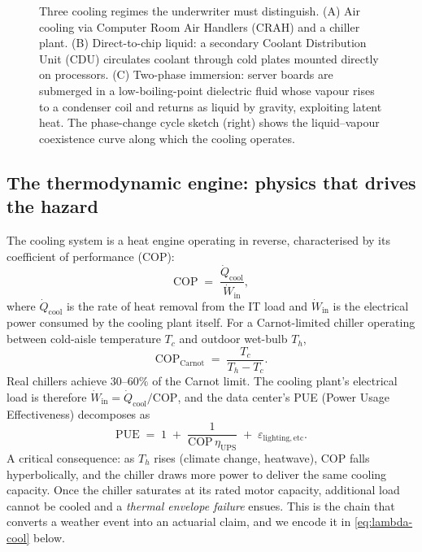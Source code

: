 \begin{figure}[ht]
\begin{tikzpicture}
\end{tikzpicture}
\caption{Three cooling regimes the underwriter must distinguish.
(A) Air cooling via Computer Room Air Handlers (CRAH) and a chiller
plant. (B) Direct-to-chip liquid: a secondary Coolant Distribution
Unit (CDU) circulates coolant through cold plates mounted directly on
processors. (C) Two-phase immersion: server boards are submerged in a
low-boiling-point dielectric fluid whose vapour rises to a condenser
coil and returns as liquid by gravity, exploiting latent heat. The
phase-change cycle sketch (right) shows the liquid--vapour coexistence
curve along which the cooling operates.}
\label{fig:cooling-topology}
\end{figure}

\subsection{The thermodynamic engine: physics that drives the hazard}\label{ss:cool-thermo}

The cooling system is a heat engine operating in reverse, characterised
by its coefficient of performance (COP):
\begin{equation}\label{eq:COP}
   \mathrm{COP} \;=\; \frac{\dot Q_{\mathrm{cool}}}{\dot W_{\mathrm{in}}},
\end{equation}
where $\dot Q_{\mathrm{cool}}$ is the rate of heat removal from the IT
load and $\dot W_{\mathrm{in}}$ is the electrical power consumed by the
cooling plant itself. For a Carnot-limited chiller operating between
cold-aisle temperature $T_c$ and outdoor wet-bulb $T_h$,
\begin{equation}\label{eq:Carnot}
   \mathrm{COP}_{\mathrm{Carnot}} \;=\;
   \frac{T_c}{T_h - T_c}.
\end{equation}
Real chillers achieve $30$--$60\%$ of the Carnot limit. The cooling
plant's electrical load is therefore
$\dot W_{\mathrm{in}}= \dot Q_{\mathrm{cool}}/\mathrm{COP}$, and the
data center's PUE (Power Usage Effectiveness) decomposes as
\begin{equation}\label{eq:PUE-decomp}
   \mathrm{PUE} \;=\; 1 \;+\; \frac{1}{\mathrm{COP}\,\eta_{\mathrm{UPS}}}
                          \;+\; \varepsilon_{\mathrm{lighting,etc}}.
\end{equation}
A critical consequence: as $T_h$ rises (climate change, heatwave),
$\mathrm{COP}$ falls hyperbolically, and the chiller draws more power
to deliver the same cooling capacity. Once the chiller saturates at
its rated motor capacity, additional load cannot be cooled and a
\emph{thermal envelope failure} ensues. This is the chain that
converts a weather event into an actuarial claim, and we encode it in
\eqref{eq:lambda-cool} below.

